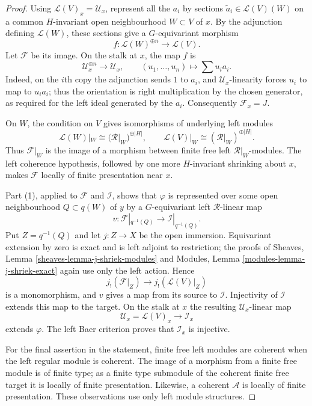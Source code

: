\begin{proof}
Using $\mathcal L(V)_x=\mathcal U_x$, represent all the $a_i$ by sections
$\widetilde a_i\in\mathcal L(V)(W)$ on a common $H$-invariant open
neighbourhood $W\subset V$ of $x$. By the adjunction defining
$\mathcal L(W)$, these sections give a $G$-equivariant morphism
$$
f:\mathcal L(W)^{\oplus n}\longrightarrow\mathcal L(V).
$$
Let $\mathcal F$ be its image. On the stalk at $x$, the map $f$ is
$$
\mathcal U_x^{\oplus n}\longrightarrow\mathcal U_x,
\qquad
(u_1,\ldots,u_n)\longmapsto\sum u_i a_i.
$$
Indeed, on the $i$th copy the adjunction sends $1$ to $a_i$, and
$\mathcal U_x$-linearity forces $u_i$ to map to $u_i a_i$; thus the
orientation is right multiplication by the chosen generator, as required
for the left ideal generated by the $a_i$.
Consequently $\mathcal F_x=J$.

On $W$, the condition on $V$ gives isomorphisms of underlying left modules
$$
\mathcal L(W)|_W\cong(\mathcal R|_W)^{\oplus |H|},
\qquad
\mathcal L(V)|_W\cong(\mathcal R|_W)^{\oplus |H|}.
$$
Thus $\mathcal F|_W$ is the image of a morphism between finite free left
$\mathcal R|_W$-modules. The left coherence hypothesis, followed by one
more $H$-invariant shrinking about $x$, makes $\mathcal F$ locally of
finite presentation near $x$.

Part (1), applied to $\mathcal F$ and $\mathcal I$, shows that $\varphi$ is
represented over some open neighbourhood $Q\subset q(W)$ of $y$ by a
$G$-equivariant left $\mathcal R$-linear map
$$
v:\mathcal F|_{q^{-1}(Q)}\longrightarrow
\mathcal I|_{q^{-1}(Q)}.
$$
Put $Z=q^{-1}(Q)$ and let $j:Z\to X$ be the open immersion. Equivariant
extension by zero is exact and is left adjoint to restriction; the proofs
of Sheaves, Lemma \ref{sheaves-lemma-j-shriek-modules} and Modules, Lemma
\ref{modules-lemma-j-shriek-exact} again use only the left action. Hence
$$
j_!(\mathcal F|_Z)\longrightarrow j_!(\mathcal L(V)|_Z)
$$
is a monomorphism, and $v$ gives a map from its source to $\mathcal I$.
Injectivity of $\mathcal I$ extends this map to the target. On the stalk at
$x$ the resulting $\mathcal U_x$-linear map
$$
\mathcal U_x=\mathcal L(V)_x\longrightarrow\mathcal I_x
$$
extends $\varphi$. The left Baer criterion proves that $\mathcal I_x$ is
injective.

For the final assertion in the statement, finite free left modules are
coherent when the left regular module is coherent. The image of a morphism
from a finite free module is of finite type; as a finite type submodule of
the coherent finite free target it is locally of finite presentation.
Likewise, a coherent $\mathcal A$ is locally of finite presentation. These
observations use only left module structures.
\end{proof}


